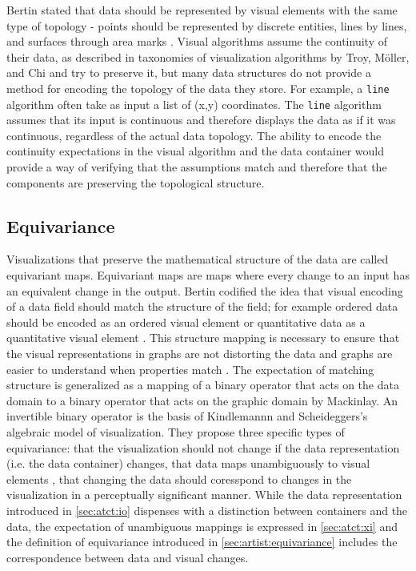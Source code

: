 \documentclass[10pt,journal,compsoc]{IEEEtran}
\theoremstyle{definition}
\theoremstyle{remark}
\begin{document}
Bertin stated that data should be represented by visual elements with the same type of topology - points should be represented by discrete entities, lines by lines, and surfaces through area marks \cite{bertinSemiologyGraphicsDiagrams2011a}.  Visual algorithms assume the continuity of their data, as described in taxonomies of visualization algorithms by Troy, M\"{o}ller, and Chi \cite{toryRethinkingVisualizationHighlevel2004,chiTaxonomyVisualizationTechniques2000} and try to preserve it, but many data structures do not provide a method for encoding the topology of the data they store. For example, a \texttt{line} algorithm often take as input a list of (x,y) coordinates. The \texttt{line} algorithm assumes that its input is continuous and therefore displays the data as if it was continuous, regardless of the actual data topology. The ability to encode the continuity expectations in the visual algorithm and the data container would provide a way of verifying that the assumptions match and therefore that the components are preserving the topological structure. 

\subsection{Equivariance}
Visualizations that preserve the mathematical structure of the data are called equivariant maps. Equivariant maps are maps where every change to an input has an equivalent change in the output. Bertin codified the idea that visual encoding of a data field should match the structure of the field; for example ordered data should be encoded as an ordered visual element or quantitative data as a quantitative visual element \cite{bertinSemiologyGraphicsDiagrams2011a}. This structure mapping is necessary to ensure that the visual representations in graphs are not distorting the data\cite{tufteVisualDisplayQuantitative2001} and graphs are easier to understand when properties match \cite{norman_things_smart}. The expectation of matching structure is generalized as a mapping of a binary operator that acts on the data domain to a binary operator that acts on the graphic domain by Mackinlay\cite{mackinlayAutomaticDesignGraphical1987}. An invertible binary operator is the basis of Kindlemannn and Scheideggers's algebraic model of visualization\cite{kindlmannAlgebraicProcessVisualization2014}. They propose three specific types of equivariance: that the visualization should not change if the data representation (i.e. the data container) changes, that data maps unambiguously to visual elements \cite{ziemkiewiczEmbeddingInformationVisualization2009}, that changing the data should coresspond to changes in the visualization in a perceptually significant manner. While the data representation introduced in \autoref{sec:atct:io} dispenses with a distinction between containers and the data, the expectation of unambiguous mappings is expressed in \autoref{sec:atct:xi} and the definition of equivariance introduced in \autoref{sec:artist:equivariance} includes the correspondence between data and visual changes. 
\end{document}
